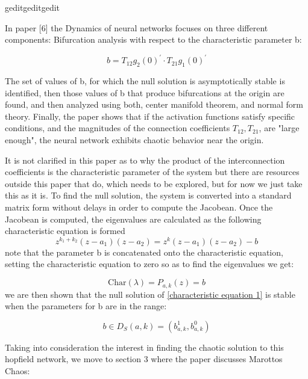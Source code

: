 geditgeditgedit\documentclass[12pt, letterpaper]{article}
\begin{document}
In paper [6] the Dynamics of neural networks focuses on three different components: Bifurcation analysis with respect to the characteristic parameter b:

\begin{equation}\label{b defintion}
b = T_{12}g_{2}(0)^{'} \cdot T_{21}g_{1}(0)^{'}
\end{equation}

The set of values of b, for which the null solution is asymptotically stable is identified, then those values of b that produce bifurcations at the origin are found, and then analyzed using both, center manifold theorem, and normal form theory. Finally, the paper shows that if the activation functions satisfy specific conditions, and the magnitudes of the connection coefficients \(T_{12}, T_{21}\), are "large enough", the neural network exhibits chaotic behavior near the origin. 

It is not clarified in this paper as to why the product of the interconnection coefficients is the characteristic parameter of the system but there are resources outside this paper that do, which needs to be explored, but for now we just take this as it is. To find the null solution, the system is converted into a standard matrix form without delays in order to compute the Jacobean. Once the Jacobean is computed, the eigenvalues are calculated as the following characteristic equation is formed
\begin{equation}\label{characteristic equation 1} 
z^{k_{1} + k_{2}}(z - a_{1})(z - a_{2})  = z^{k}(z - a_{1})(z - a_{2}) - b
\end{equation}
note that the parameter b is concatenated onto the characteristic equation, setting the characteristic equation to zero so as to find the eigenvalues we get:

\begin{equation}\label{characteristic equation 2}
    \text{Char}(\lambda) = P_{a,k}(z) = b
\end{equation}
we are then shown that the null solution of \ref{characteristic equation 1} is stable when the parameters for b are in the range:

\begin{equation}\label{Null Solution Stability}
    b \in D_{S}(a,k) = (b_{a,k}^{1}, b_{a,k}^{0})
\end{equation}

Taking into consideration the interest in finding the chaotic solution to this hopfield network, we move to section 3 where the paper discusses Marottos Chaos:
\end{document}
